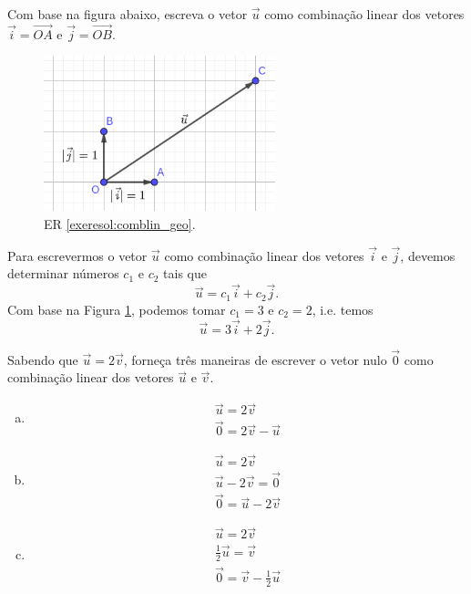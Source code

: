 \begin{exeresol}\label{exeresol:comblin_geo}
  Com base na figura abaixo, escreva o vetor $\vec{u}$ como combinação linear dos vetores $\vec{i}=\overrightarrow{OA}$ e $\vec{j}=\overrightarrow{OB}$.

  \begin{figure}[H]
    \centering
    \includegraphics[width=0.6\textwidth]{cap_base/dados/fig_comblin_exeresol_geo/fig_comblin_exeresol_geo}
    \caption{ER \ref{exeresol:comblin_geo}.}
    \label{fig:comblin_exeresol_geo}
  \end{figure}
\end{exeresol}
\begin{resol}
  Para escrevermos o vetor $\vec{u}$ como combinação linear dos vetores $\vec{i}$ e $\vec{j}$, devemos determinar números $c_1$ e $c_2$ tais que
  \begin{equation}
    \vec{u} = c_1\vec{i} + c_2\vec{j}.
  \end{equation}
  Com base na Figura \ref{fig:comblin_exeresol_geo}, podemos tomar $c_1 = 3$ e $c_2=2$, i.e. temos
  \begin{equation}
    \vec{u} = 3\vec{i} + 2\vec{j}.
  \end{equation}
\end{resol}

\begin{exeresol}
  Sabendo que $\vec{u}=2\vec{v}$, forneça três maneiras de escrever o vetor nulo $\vec{0}$ como combinação linear dos vetores $\vec{u}$ e $\vec{v}$.
\end{exeresol}
\begin{resol}
  \begin{enumerate}[a)]
  \item
    \begin{gather}
      \vec{u}=2\vec{v}\\
      \vec{0}=2\vec{v}-\vec{u}
    \end{gather}
  \item
    \begin{gather}
      \vec{u}=2\vec{v}\\
      \vec{u}-2\vec{v}=\vec{0}\\
      \vec{0}=\vec{u}-2\vec{v}
    \end{gather}
  \item
    \begin{gather}
      \vec{u}=2\vec{v}\\
      \frac{1}{2}\vec{u}=\vec{v}\\
      \vec{0}=\vec{v}-\frac{1}{2}\vec{u}
    \end{gather}
  \end{enumerate}
\end{resol}

